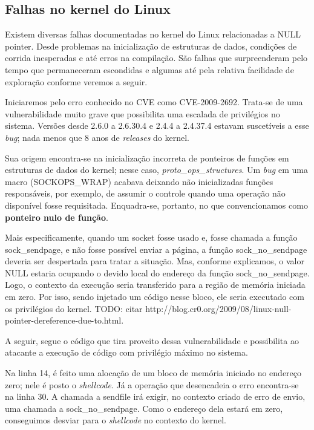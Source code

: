 		
		\subsection{Falhas no kernel do Linux}
		\label{subsec:linux_kernel_vuln}
			Existem diversas falhas documentadas no kernel do Linux relacionadas a NULL pointer.
			Desde problemas na inicialização de estruturas de dados, condições de corrida
			inesperadas e até erros na compilação.		
			São falhas que surpreenderam pelo tempo que permaneceram escondidas e algumas até pela
			relativa facilidade de exploração conforme veremos a seguir.
	
			Iniciaremos pelo erro conhecido no CVE como CVE-2009-2692.
			Trata-se de uma vulnerabilidade muito grave que possibilita uma escalada de privilégios
			no sistema. Versões desde 2.6.0 a 2.6.30.4 e 2.4.4 a 2.4.37.4 estavam suscetíveis
			a esse \textsl{bug}; nada menos que 8 anos de \textsl{releases} do kernel.

			
			Sua origem encontra-se na inicialização incorreta de ponteiros de funções em estruturas
			de dados do kernel; nesse caso, \textsl{proto\_ops\_structures}. 
			Um \textsl{bug} em uma macro (SOCKOPS\_WRAP) acabava deixando não inicializadas
			funções responsáveis, por exemplo, de assumir o controle quando uma operação não disponível fosse
			requisitada. Enquadra-se, portanto, no que convencionamos como \textbf{ponteiro nulo de função}.

			
			Mais especificamente, quando um socket fosse usado e, fosse chamada a função sock\_sendpage,
			e não fosse possível enviar a página, a função sock\_no\_sendpage deveria ser despertada
			para tratar a situação. Mas, conforme explicamos, o valor NULL estaria ocupando o devido
			local do endereço da função sock\_no\_sendpage. Logo, o contexto da execução seria transferido
			para a região de memória iniciada em zero. Por isso, sendo injetado um código nesse bloco,
			ele seria executado com os privilégios do kernel.
			TODO: citar http://blog.cr0.org/2009/08/linux-null-pointer-dereference-due-to.html.

	
			A seguir, segue o código que tira proveito dessa vulnerabilidade e possibilita ao atacante
			a execução de código com privilégio máximo no sistema.  
			
			Na linha 14, é feito uma alocação de um bloco de memória iniciado no endereço zero; nele é posto
			o \textsl{shellcode}. Já a operação que desencadeia o erro encontra-se na linha 30.
			A chamada a sendfile irá exigir, no contexto criado de erro de envio, uma chamada 
			a sock\_no\_sendpage.
			Como o endereço dela estará em zero, conseguimos desviar para o \textsl{shellcode} no contexto do kernel.

